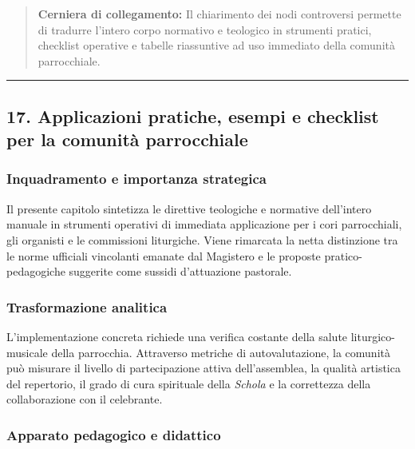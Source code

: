 \documentclass[12pt,a4paper]{article}
\begin{document}
	\begin{quote}
		\textbf{Cerniera di collegamento:} Il chiarimento dei nodi controversi permette di tradurre l'intero corpo normativo e teologico in strumenti pratici, checklist operative e tabelle riassuntive ad uso immediato della comunità parrocchiale.
	\end{quote}
	
	\begin{center}\rule{0.5\linewidth}{0.5pt}\end{center}
	
	\subsection{17. Applicazioni pratiche, esempi e checklist per la comunità parrocchiale}\label{applicazioni-pratiche-esempi-e-checklist-per-la-comunita-parrocchiale}
	
	\subsubsection{Inquadramento e importanza strategica}\label{inquadramento-e-importanza-strategica-15}
	
	Il presente capitolo sintetizza le direttive teologiche e normative dell'intero manuale in strumenti operativi di immediata applicazione per i cori parrocchiali, gli organisti e le commissioni liturgiche. Viene rimarcata la netta distinzione tra le norme ufficiali vincolanti emanate dal Magistero e le proposte pratico-pedagogiche suggerite come sussidi d'attuazione pastorale.
	
	\subsubsection{Trasformazione analitica}\label{trasformazione-analitica-16}
	
	L'implementazione concreta richiede una verifica costante della salute liturgico-musicale della parrocchia. Attraverso metriche di autovalutazione, la comunità può misurare il livello di partecipazione attiva dell'assemblea, la qualità artistica del repertorio, il grado di cura spirituale della \emph{Schola} e la correttezza della collaborazione con il celebrante.
	
	\subsubsection{Apparato pedagogico e didattico}\label{apparato-pedagogico-e-didattico-16}
	
\end{document}

